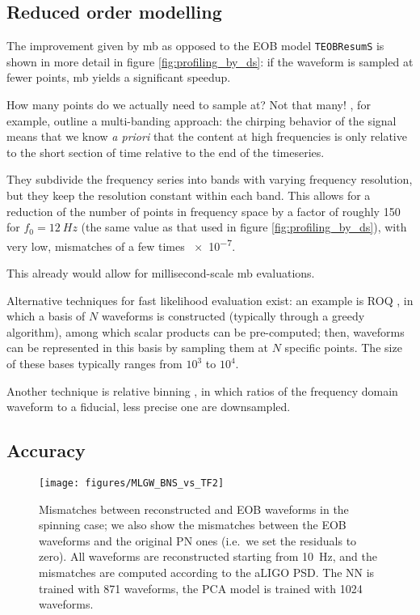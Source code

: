 \documentclass[main.tex]{subfiles}
\begin{document}
\subsection{Reduced order modelling} \label{sec:reduced-order-modelling}

The improvement given by \ac{mb} as opposed to the \ac{EOB} model \texttt{TEOBResumS} is shown in more detail in figure \ref{fig:profiling_by_ds}: if the waveform is sampled at fewer points, \ac{mb} yields a significant speedup. 

How many points do we actually need to sample at? Not that many! 
\textcite{vinciguerraAcceleratingGravitationalWave2017}, for example, outline a multi-banding approach: the chirping behavior of the signal means that we know \emph{a priori} that the content at high frequencies is only relative to the short section of time relative to the end of the timeseries. 

They subdivide the frequency series into bands with varying frequency resolution, but they keep the resolution constant within each band.
This allows for a reduction of the number of points in frequency space by a factor of roughly 150 for \(f_0 = \SI{12}{Hz}\) (the same value as that used in figure \ref{fig:profiling_by_ds}), with very low, mismatches of a few times \num{e-7}. 

This already would allow for millisecond-scale \ac{mb} evaluations. 

Alternative techniques for fast likelihood evaluation exist: an example is \ac{ROQ} \cites{smithFastAccurateInference2016}{canizaresAcceleratedGravitationalWave2015}, in which a basis of \(N\) waveforms is constructed (typically through a greedy algorithm), among which scalar products can be pre-computed; then, waveforms can be represented in this basis by sampling them at \(N\) specific points. 
The size of these bases typically ranges from \(10^3\) to \(10^4\). 

Another technique is relative binning \cite{zackayRelativeBinningFast2018}, in which ratios of the frequency domain waveform to a fiducial, less precise one are downsampled. 


\subsection{Accuracy} \label{sec:accuracy}

\begin{figure}[ht]
\centering
\texttt{[image: figures/MLGW\_BNS\_vs\_TF2]}
\caption{Mismatches between reconstructed and \ac{EOB} waveforms in the spinning case; we also show the mismatches between the \ac{EOB} waveforms and the original \ac{PN} ones (i.e.\ we set the residuals to zero). All waveforms are reconstructed starting from \SI{10}{Hz}, and the mismatches are computed according to the \ac{aLIGO} \ac{PSD}. The \ac{NN} is trained with 871 waveforms, the \ac{PCA} model is trained with 1024 waveforms.}
\label{fig:MLGW_BNS_vs_TF2}
\end{figure}
\end{document}
